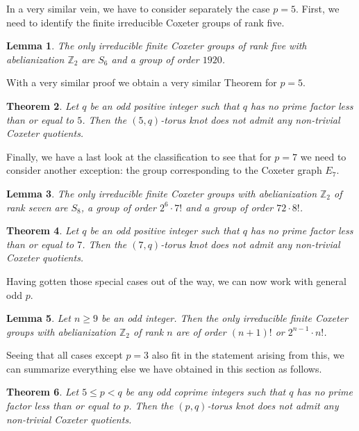 \documentclass{article}
\newtheorem{theorem}{Theorem}[section]
\newtheorem{lemma}[theorem]{Lemma}
\theoremstyle{definition}
\begin{document}
In a very similar vein, we have to consider separately the case $p = 5$. First, we need to identify the finite irreducible Coxeter groups of rank five.

\begin{lemma}
The only irreducible finite Coxeter groups of rank five with abelianization $\mathbb{Z}_2$ are $S_6$ and a group of order $1920$.
\end{lemma}

With a very similar proof we obtain a very similar Theorem for $p = 5$.

\begin{theorem}
Let $q$ be an odd positive integer such that $q$ has no prime factor less than or equal to $5$. Then the $(5, q)$-torus knot does not admit any non-trivial Coxeter quotients.
\end{theorem}

Finally, we have a last look at the classification to see that for $p = 7$ we need to consider another exception: the group corresponding to the Coxeter graph $E_7$.

\begin{lemma}
The only irreducible finite Coxeter groups with abelianization $\mathbb{Z}_2$ of rank seven are $S_8$, a group of order $2^6 \cdot 7!$ and a group of order $72 \cdot 8!$.
\end{lemma}

\begin{theorem}
Let $q$ be an odd positive integer such that $q$ has no prime factor less than or equal to $7$. Then the $(7, q)$-torus knot does not admit any non-trivial Coxeter quotients.
\end{theorem}

Having gotten those special cases out of the way, we can now work with general odd $p$.

\begin{lemma}
Let $n \geq 9$ be an odd integer. Then the only irreducible finite Coxeter groups with abelianization $\mathbb{Z}_2$ of rank $n$ are of order $(n+1)!$ or $2^{n-1}\cdot n!$.
\end{lemma}

Seeing that all cases except $p = 3$ also fit in the statement arising from this, we can summarize everything else we have obtained in this section as follows.

\begin{theorem}
Let $5 \leq p < q$ be any odd coprime integers such that $q$ has no prime factor less than or equal to $p$. Then the $(p, q)$-torus knot does not admit any non-trivial Coxeter quotients.
\end{theorem}
\end{document}
